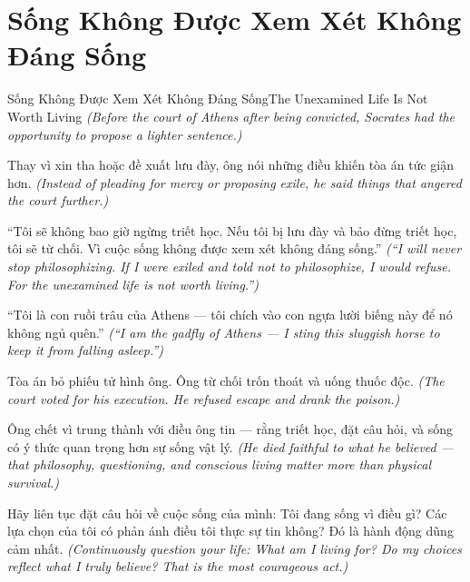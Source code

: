 \section{Sống Không Được Xem Xét Không Đáng Sống}
\begin{truyen}{Sống Không Được Xem Xét Không Đáng Sống}{The Unexamined Life Is Not Worth Living}
\textit{(Before the court of Athens after being convicted, Socrates had the opportunity to propose a lighter sentence.)}

Thay vì xin tha hoặc đề xuất lưu đày, ông nói những điều khiến tòa án tức giận hơn.
\textit{(Instead of pleading for mercy or proposing exile, he said things that angered the court further.)}

``Tôi sẽ không bao giờ ngừng triết học. Nếu tôi bị lưu đày và bảo đừng triết học, tôi sẽ từ chối. Vì cuộc sống không được xem xét không đáng sống.''
\textit{(``I will never stop philosophizing. If I were exiled and told not to philosophize, I would refuse. For the unexamined life is not worth living.'')}

``Tôi là con ruồi trâu của Athens — tôi chích vào con ngựa lười biếng này để nó không ngủ quên.''
\textit{(``I am the gadfly of Athens — I sting this sluggish horse to keep it from falling asleep.'')}

Tòa án bỏ phiếu tử hình ông. Ông từ chối trốn thoát và uống thuốc độc.
\textit{(The court voted for his execution. He refused escape and drank the poison.)}

Ông chết vì trung thành với điều ông tin — rằng triết học, đặt câu hỏi, và sống có ý thức quan trọng hơn sự sống vật lý.
\textit{(He died faithful to what he believed — that philosophy, questioning, and conscious living matter more than physical survival.)}

\end{truyen}

\begin{baihoc}
Hãy liên tục đặt câu hỏi về cuộc sống của mình: Tôi đang sống vì điều gì? Các lựa chọn của tôi có phản ánh điều tôi thực sự tin không? Đó là hành động dũng cảm nhất.
\textit{(Continuously question your life: What am I living for? Do my choices reflect what I truly believe? That is the most courageous act.)}
\end{baihoc}
\ngancach


